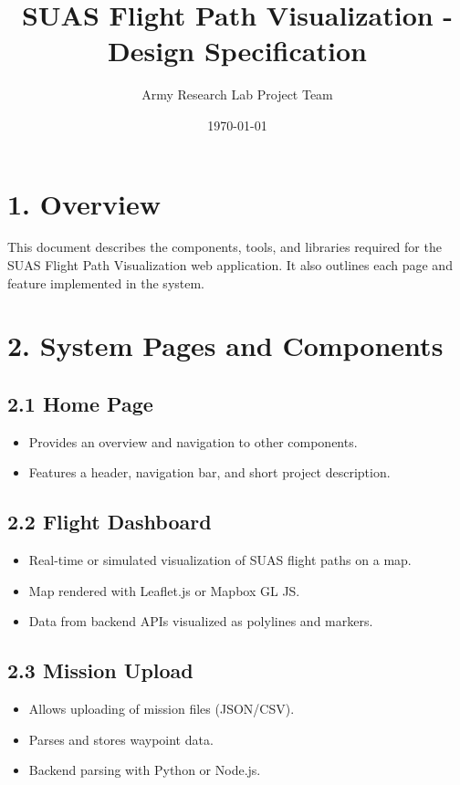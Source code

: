 \documentclass[12pt]{article}
\title{SUAS Flight Path Visualization - Design Specification}
\author{Army Research Lab Project Team}
\date{\today}
\begin{document}
\maketitle

\section*{1. Overview}
This document describes the components, tools, and libraries required for the SUAS Flight Path Visualization web application. It also outlines each page and feature implemented in the system.

\section*{2. System Pages and Components}

\subsection*{2.1 Home Page}
\begin{itemize}
    \item Provides an overview and navigation to other components.
    \item Features a header, navigation bar, and short project description.
\end{itemize}

\subsection*{2.2 Flight Dashboard}
\begin{itemize}
    \item Real-time or simulated visualization of SUAS flight paths on a map.
    \item Map rendered with Leaflet.js or Mapbox GL JS.
    \item Data from backend APIs visualized as polylines and markers.
\end{itemize}

\subsection*{2.3 Mission Upload}
\begin{itemize}
    \item Allows uploading of mission files (JSON/CSV).
    \item Parses and stores waypoint data.
    \item Backend parsing with Python or Node.js.
\end{itemize}
\end{document}

